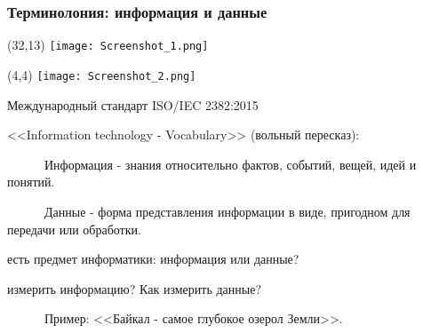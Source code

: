\documentclass[aspectratio=169, 11pt]{beamer}
\begin{document}
	
	\begin{frame}
		\frametitle{\textbf{\textcolor[rgb]{0.4,0.4,0.4}{\textcolor[rgb]{0,0,1}{Т}ерминолония: информация и данные}}}
		
\begin{textblock}{50}(32,13)
	\texttt{[image: Screenshot\_1.png]}
\end{textblock}
		
		\begin{textblock}{50}(4,4)
			\texttt{[image: Screenshot\_2.png]}
		\end{textblock}
	
		Международный стандарт ISO/IEC 2382:2015
		
		<<Information technology - Vocabulary>> (вольный пересказ):
		\vspace{2mm}
		
		~~~~~~\textcolor[rgb]{0,0.64,0.09}{Информация} - знания относительно фактов, событий, вещей, идей и понятий.
		
		~~~~~~\textcolor[rgb]{0,0.64,0.09}{Данные} - форма представления информации в виде, пригодном для передачи или обработки.
		\vspace{4mm}
		
		\begin{itemize}
		 есть предмет информатики: информация или данные?
		
		 измерить информацию? Как измерить данные?
		\end{itemize}
		~~~~~~Пример: <<Байкал - самое глубокое озерол Земли>>.
	\end{frame}
	
\end{document}
